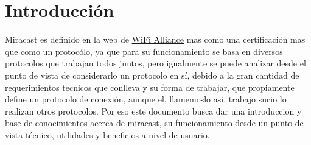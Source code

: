\section{Introducción}

Miracast es definido en la web de \href{http://www.wi-fi.org/discover-wi-fi/wi-fi-certified-miracast}{WiFi Alliance} mas como una certificación mas que como un protocólo, ya que para su funcionamiento se basa en diversos protocolos que trabajan todos juntos, pero igualmente se puede analizar desde el punto de vista de considerarlo un protocolo en sí, debido a la gran cantidad de requerimientos tecnicos que conlleva y su forma de trabajar, que propiamente define un protocolo de conexión, aunque el, llamemoslo asi, trabajo sucio lo realizan otros protocolos. Por eso este documento busca dar una introduccion y base de conocimientos acerca de miracast, su funcionamiento desde un punto de vista técnico, utilidades y beneficios a nivel de usuario.
